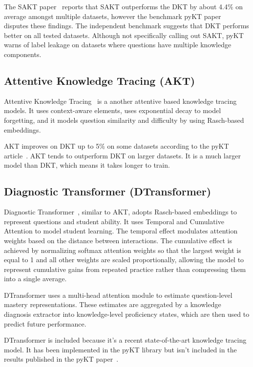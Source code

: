 The SAKT paper~\autocite{sakt} reports that SAKT outperforms the DKT by about 4.4\% on average amongst multiple datasets, however the benchmark pyKT paper~\autocite{pyktPaper} disputes these findings. The independent benchmark suggests that DKT performs better on all tested datasets. Although not specifically calling out SAKT, pyKT warns of label leakage on datasets where questions have multiple knowledge components.

\subsection{Attentive Knowledge Tracing (AKT)}
Attentive Knowledge Tracing~\autocite{akt} is a another attentive based knowledge tracing models. It uses context-aware elements, uses exponential decay to model forgetting, and it models question similarity and difficulty by using Rasch-based embeddings.

AKT improves on DKT up to 5\% on some datasets according to the pyKT article~\autocite{pyktPaper}. AKT tends to outperform DKT on larger datasets. It is a much larger model than DKT, which means it takes longer to train.

\subsection{Diagnostic Transformer (DTransformer)}
Diagnostic Transformer~\autocite{dtransformer}, similar to AKT, adopts Rasch-based embeddings to represent questions and student ability. It uses Temporal and Cumulative Attention to model student learning. The temporal effect modulates attention weights based on the distance between interactions. The cumulative effect is achieved by normalizing softmax attention weights so that the largest weight is equal to 1 and all other weights are scaled proportionally, allowing the model to represent cumulative gains from repeated practice rather than compressing them into a single average.

DTransformer uses a multi-head attention module to estimate question-level mastery representations. These estimates are aggregated by a knowledge diagnosis extractor into knowledge-level proficiency states, which are then used to predict future performance.

DTransformer is included because it's a recent state-of-the-art knowledge tracing model. It has been implemented in the pyKT library but isn't included in the results published in the pyKT paper~\autocite{pyktPaper}.

